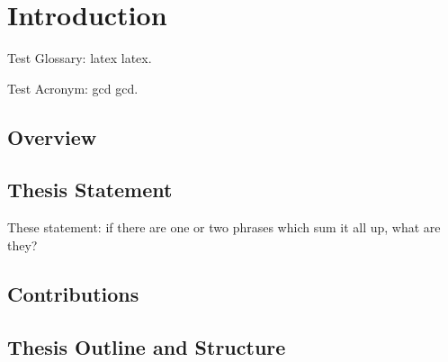 \chapter{Introduction}

Test Glossary: \Gls{latex} \gls{latex}.

Test Acronym: \acrlong{gcd} \acrshort{gcd}.

\section{Overview}

\section{Thesis Statement}

These statement: if there are one or two phrases which sum it all up, what are they?

\section{Contributions}

\section{Thesis Outline and Structure}
